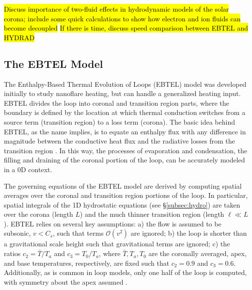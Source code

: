 %
\par\hl{Discuss importance of two-fluid effects in hydrodynamic models of the solar corona; include some quick calculations to show how electron and ion fluids can become decoupled}
\hl{If there is time, discuss speed comparison between EBTEL and HYDRAD}
%
\subsection{The EBTEL Model}
\label{subsec:ebtel}
%
\par The Enthalpy-Based Thermal Evolution of Loops (EBTEL) model \citep{klimchuk_highly_2008,cargill_enthalpy-based_2012} was developed initially to study nanoflare heating, but can handle a generalized heating input. EBTEL divides the loop into coronal and transition region parts, where the boundary is defined by the location at which thermal conduction switches from a source term (transition region) to a loss term (corona). The basic idea behind EBTEL, as the name implies, is to equate an enthalpy flux with any difference in magnitude between the conductive heat flux and the radiative losses from the transition region \citep{klimchuk_highly_2008}. In this way, the processes of evaporation and condensation, the filling and draining of the coronal portion of the loop, can be accurately modeled in a 0D context. 
%
\par The governing equations of the EBTEL model are derived by computing spatial averages over the coronal and transition region portions of the loop. In particular, spatial integrals of the 1D hydrostatic equations (see \S\ref{subsec:hydro}) are taken over the corona (length $L$) and the much thinner transition region (length $\ell\ll L$). EBTEL relies on several key assumptions: a) the flow is assumed to be subsonic, $v<C_s$, such that terms $\mathcal{O}(v^2)$ are ignored; b) the loop is shorter than a gravitational scale height such that gravitational terms are ignored; c) the ratios $c_2=\bar{T}/T_a$ and $c_3=T_0/T_a$, where $\bar{T},T_a,T_0$ are the coronally averaged, apex, and base temperatures, respectively, are fixed such that $c_2=0.9$ and $c_3=0.6$. Additionally, as is common in loop models, only one half of the loop is computed, with symmetry about the apex assumed \citep{klimchuk_highly_2008}.
%
